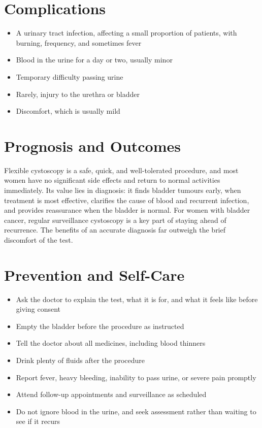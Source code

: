 \section*{Complications}
\begin{itemize}
    \item A urinary tract infection, affecting a small proportion of patients, with burning, frequency, and sometimes fever
    \item Blood in the urine for a day or two, usually minor
    \item Temporary difficulty passing urine
    \item Rarely, injury to the urethra or bladder
    \item Discomfort, which is usually mild
\end{itemize}

\section*{Prognosis and Outcomes}
Flexible cystoscopy is a safe, quick, and well-tolerated procedure, and most women have no significant side effects and return to normal activities immediately. Its value lies in diagnosis: it finds bladder tumours early, when treatment is most effective, clarifies the cause of blood and recurrent infection, and provides reassurance when the bladder is normal. For women with bladder cancer, regular surveillance cystoscopy is a key part of staying ahead of recurrence. The benefits of an accurate diagnosis far outweigh the brief discomfort of the test.

\section*{Prevention and Self-Care}
\begin{itemize}
    \item Ask the doctor to explain the test, what it is for, and what it feels like before giving consent
    \item Empty the bladder before the procedure as instructed
    \item Tell the doctor about all medicines, including blood thinners
    \item Drink plenty of fluids after the procedure
    \item Report fever, heavy bleeding, inability to pass urine, or severe pain promptly
    \item Attend follow-up appointments and surveillance as scheduled
    \item Do not ignore blood in the urine, and seek assessment rather than waiting to see if it recurs
\end{itemize}

